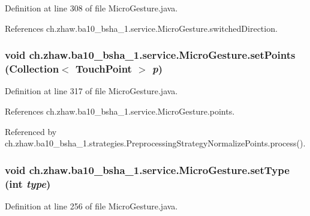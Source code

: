 Definition at line 308 of file MicroGesture.java.

References ch.zhaw.ba10\_\-bsha\_\-1.service.MicroGesture.switchedDirection.\hypertarget{classch_1_1zhaw_1_1ba10__bsha__1_1_1service_1_1MicroGesture_a71ef1e00c42a00874e551707d73de579}{
\subsubsection[{setPoints}]{\setlength{\rightskip}{0pt plus 5cm}void ch.zhaw.ba10\_\-bsha\_\-1.service.MicroGesture.setPoints (Collection$<$ {\bf TouchPoint} $>$ {\em p})}}
\label{classch_1_1zhaw_1_1ba10__bsha__1_1_1service_1_1MicroGesture_a71ef1e00c42a00874e551707d73de579}


Definition at line 317 of file MicroGesture.java.

References ch.zhaw.ba10\_\-bsha\_\-1.service.MicroGesture.points.

Referenced by ch.zhaw.ba10\_\-bsha\_\-1.strategies.PreprocessingStrategyNormalizePoints.process().\hypertarget{classch_1_1zhaw_1_1ba10__bsha__1_1_1service_1_1MicroGesture_ae7f33d544189f7cf99710d8694beec56}{
\subsubsection[{setType}]{\setlength{\rightskip}{0pt plus 5cm}void ch.zhaw.ba10\_\-bsha\_\-1.service.MicroGesture.setType (int {\em type})}}
\label{classch_1_1zhaw_1_1ba10__bsha__1_1_1service_1_1MicroGesture_ae7f33d544189f7cf99710d8694beec56}


Definition at line 256 of file MicroGesture.java.

